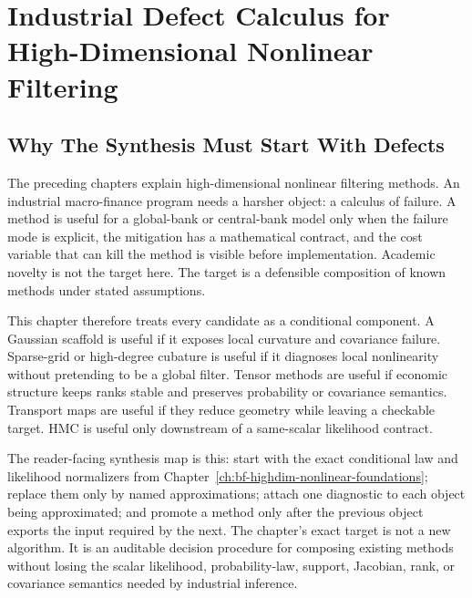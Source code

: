\chapter[Industrial Defect Calculus]{Industrial Defect Calculus for High-Dimensional Nonlinear Filtering}
\label{ch:bf-highdim-candidate-synthesis}

\section{Why The Synthesis Must Start With Defects}
\label{sec:bf-hd-synthesis-purpose}

The preceding chapters explain high-dimensional nonlinear filtering methods.
An industrial macro-finance program needs a harsher object: a calculus of
failure.  A method is useful for a global-bank or central-bank model only when
the failure mode is explicit, the mitigation has a mathematical contract, and
the cost variable that can kill the method is visible before implementation.
Academic novelty is not the target here.  The target is a defensible
composition of known methods under stated assumptions.

This chapter therefore treats every candidate as a conditional component.  A
Gaussian scaffold is useful if it exposes local curvature and covariance
failure.  Sparse-grid or high-degree cubature is useful if it diagnoses local
nonlinearity without pretending to be a global filter.  Tensor methods are
useful if economic structure keeps ranks stable and preserves probability or
covariance semantics.  Transport maps are useful if they reduce geometry while
leaving a checkable target.  HMC is useful only downstream of a same-scalar
likelihood contract.

The reader-facing synthesis map is this: start with the exact conditional law
and likelihood normalizers from Chapter~\ref{ch:bf-highdim-nonlinear-foundations};
replace them only by named approximations; attach one diagnostic to each
object being approximated; and promote a method only after the previous object
exports the input required by the next.  The chapter's exact target is not a
new algorithm.  It is an auditable decision procedure for composing existing
methods without losing the scalar likelihood, probability-law, support,
Jacobian, rank, or covariance semantics needed by industrial inference.

